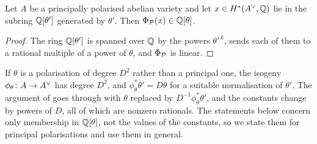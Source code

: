 \begin{corollary}\label{cor:stability}
Let $A$ be a principally polarised abelian variety and let
$x\in H^{*}(A^{\vee},\mathbb{Q})$ lie in the subring $\mathbb{Q}[\theta']$ generated by $\theta'$.
Then $\Phi_{\mathcal{P}}(x)\in\mathbb{Q}[\theta]$.
\end{corollary}

\begin{proof}
The ring $\mathbb{Q}[\theta']$ is spanned over $\mathbb{Q}$ by the powers
$\theta'^{\,k}$,  sends each of them to a rational
multiple of a power of $\theta$, and $\Phi_{\mathcal{P}}$ is linear.
\end{proof}

\begin{remark}\label{rem:nonprincipal}
If $\theta$ is a polarisation of degree $D^{2}$ rather than a principal
one, the isogeny $\phi_{\theta}\colon A\to A^{\vee}$ has degree $D^{2}$,
and $\phi_{\theta}^{*}\theta'=D\theta$ for a suitable normalisation of
$\theta'$. The argument of  goes through with $\theta$
replaced by $D^{-1}\phi_{\theta}^{*}\theta'$, and the constants change
by powers of $D$, all of which are nonzero rationals. The statements below
concern only membership in $\mathbb{Q}[\theta]$, not the values of the constants, so
we state them for principal polarisations and use them in general.
\end{remark}
